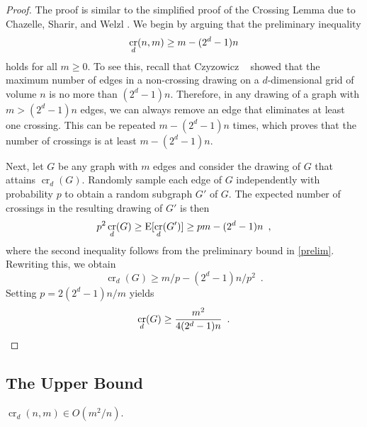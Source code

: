 \documentclass{patmorin}
\DeclareMathOperator{\crs}{cr}
\begin{document}
\begin{proof}
  The proof is similar to the simplified proof of the Crossing Lemma
  due to Chazelle, Sharir, and Welzl \cite{S}.  We begin by arguing that
  the preliminary inequality 
  \begin{equation}
    \crs_d(n,m) \ge m - (2^d-1)n  \eqlabel{prelim}
  \end{equation}
  holds for all $m \ge 0$.  To see this, recall that Czyzowicz \etal\
  \cite{s} showed that the maximum number of edges in a non-crossing
  drawing on a $d$-dimensional grid of volume $n$ is no more than
  $(2^d-1)n$.  Therefore, in any drawing of a graph with $m> (2^d-1)n$
  edges, we can always remove an edge that eliminates at least one
  crossing.  This can be repeated $m-(2^d-1)n$ times, which proves that
  the number of crossings is at least $m-(2^d-1)n$.

  Next, let $G$ be any graph with $m$ edges and consider the drawing
  of $G$ that attains $\crs_d(G)$.  Randomly sample each edge of $G$
  independently with probability $p$ to obtain a random subgraph $G'$
  of $G$.  The expected number of crossings in the resulting drawing of
  $G'$ is then
  \[  p^2\crs_d(G) \ge \E[\crs_d(G')] \ge pm - (2^d-1)n \enspace ,\] 
  where the second inequality follows from the preliminary bound
  in \eqref{prelim}.  Rewriting this, we obtain
  \[  \crs_d(G) \ge m/p - (2^d-1)n/p^2 \enspace . \]
  Setting $p=2(2^{d}-1)n/m$ yields
  \[  \crs_d(G) \ge \frac{m^2}{4(2^{d}-1)n} \enspace .  \qedhere \]
\end{proof}

\subsection{The Upper Bound}

\begin{thm}
  $\crs_d(n,m)\in O(m^2/n)$.
\end{thm}
\end{document}
